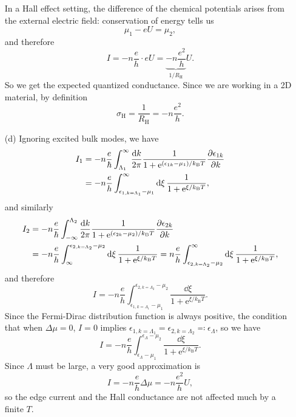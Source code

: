\documentclass[hyperref, a4paper]{article}
\newcommand*{\ee}{\mathrm{e}}
\begin{document}
\begin{itemize}
In a Hall effect setting, the difference of the chemical potentials arises from the external electric field:
conservation of energy tells us 
\begin{equation}
    \mu_1 - e U = \mu_2,
\end{equation}
and therefore 
\begin{equation}
    I = - n \frac{e}{h} \cdot e U = \underbrace{ - n \frac{e^2}{h} }_{1 / R_{\text{H}}} U.
\end{equation}
So we get the expected quantized conductance.
Since we are working in a 2D material, by definition 
\begin{equation}
    \sigma_{\text{H}} = \frac{1}{R_{\text{H}}} = - n \frac{e^2}{h}.
\end{equation}

\item[(d)] Ignoring excited bulk modes, we have 
\begin{equation}
    \begin{aligned}
        I_1 &= - n \frac{e}{\hbar} \int_{\Lambda_1}^{\infty} 
        \frac{\dd{k}}{2\pi} \frac{1}{1 + \ee^{(\epsilon_{1k} - \mu_1) / k_{\text{B}} T}} \pdv{\epsilon_{1k}}{k} \\
        &= - n \frac{e}{h} \int_{\epsilon_{1, k = \Lambda_1} - \mu_1}^{\infty} 
        \dd{\xi} \frac{1}{1 + \ee^{\xi / k_{\text{B}} T} }, 
    \end{aligned}
\end{equation}
and similarly 
\begin{equation}
    \begin{aligned}
        I_2 &= - n \frac{e}{\hbar} \int^{\Lambda_2}_{-\infty} 
        \frac{\dd{k}}{2\pi} \frac{1}{1 + \ee^{(\epsilon_{2k} - \mu_2) / k_{\text{B}} T}} \pdv{\epsilon_{2k}}{k} \\
        &= - n \frac{e}{h} \int^{\epsilon_{2, k = \Lambda_2} - \mu_2}_{\infty} 
        \dd{\xi} \frac{1}{1 + \ee^{\xi / k_{\text{B}} T} } 
        = n \frac{e}{h} \int_{\epsilon_{2, k = \Lambda_2} - \mu_2}^{\infty} 
        \dd{\xi} \frac{1}{1 + \ee^{\xi / k_{\text{B}} T} } , 
    \end{aligned}
    \label{eq:i-2-e}
\end{equation}
and therefore 
\begin{equation}
    I = - n \frac{e}{h} \int_{\epsilon_{1, k = \Lambda_1} - \mu_1}^{\epsilon_{2, k = \Lambda_2} - \mu_2}
    \frac{\dd{\xi}}{1 + \ee^{\xi / k_{\text{B}} T}}.
\end{equation}
Since the Fermi-Dirac distribution function is always positive,
the condition that when $\Delta \mu = 0$, $I = 0$
implies $\epsilon_{1, k=\Lambda_1} = \epsilon_{2, k=\Lambda_2} \eqqcolon \epsilon_\Lambda$, so we have 
\begin{equation}
    I = - n \frac{e}{h} \int_{\epsilon_{\Lambda} - \mu_1}^{\epsilon_{\Lambda} - \mu_2}
    \frac{\dd{\xi}}{1 + \ee^{\xi / k_{\text{B}} T}}.
\end{equation}
Since $\Lambda$ must be large, a very good approximation is 
\begin{equation}
    I = - n \frac{e}{h} \Delta \mu = - n \frac{e^2}{h} U,
\end{equation}
so the edge current and the Hall conductance are not affected much by a finite $T$.


\end{itemize}
\end{document}
